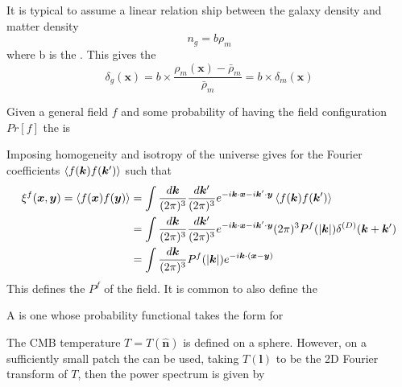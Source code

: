 \documentclass{article}
\begin{document}
It is typical to assume a linear relation ship between the galaxy density and matter density 
\[
n_g = b \rho_m
\]
where b is the . This gives the 
\[
\delta_g(\bm{x}) = b \times \frac{\rho_m(\bm{x})-\bar{\rho}_m}{\bar{\rho}_m} = b \times \delta_m(\bm{x})
\]

\begin{definition}
Given a general field $f$ and some probability of having the field configuration $Pr[f]$ the  is 
\end{definition}

\begin{lemma}
Imposing homogeneity and isotropy of the universe gives 
for the Fourier coefficients $\braket{f(\bm{k})f(\bm{k}^\prime)}$ such that 
\begin{align}\label{eq:CSM:15}
 \xi^f(\bm{x},\bm{y}) = \braket{f(\bm{x})f(\bm{y})} &= \int \frac{d\bm{k}}{(2\pi)^3} \frac{d\bm{k}^\prime}{(2\pi)^3} e^{-i\bm{k}\cdot\bm{x} -i \bm{k}^\prime \cdot \bm{y}} \braket{f(\bm{k})f(\bm{k}^\prime)} \\
 &=\int \frac{d\bm{k}}{(2\pi)^3} \frac{d\bm{k}^\prime}{(2\pi)^3} e^{-i\bm{k}\cdot\bm{x} -i \bm{k}^\prime \cdot \bm{y}}  (2\pi)^3 P^f(|\bm{k}|) \delta^{(D)}(\bm{k} + \bm{k}^\prime) \\
 &= \int \frac{d\bm{k}}{(2\pi)^3} P^f(|\bm{k}|) e^{-i\bm{k} \cdot (\bm{x} - \bm{y})}
\end{align}
This defines the  $P^f$ of the field. It is common to also define the  
\end{lemma}

\begin{definition}
A  is one whose probability functional takes the form 
for 
\end{definition}

\begin{definition}
The CMB temperature $T=T(\hat{\bm{n}})$ is defined on a sphere. However, on a sufficiently small patch the  can be used, taking $T(\bm{l})$ to be the 2D Fourier transform of $T$, then the power spectrum is given by 
\end{definition}
\end{document}
